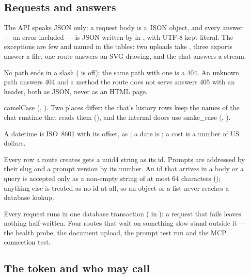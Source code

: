 \subsection{Requests and answers}\label{sec:api:json}

The API speaks JSON only: a request body is a JSON object, and every answer --- an error
included --- is JSON written by  in , with UTF-8 kept
literal. The exceptions are few and named in the tables: two uploads take
, three exports answer a file, one route answers an SVG drawing, and
the chat answers a stream.

\begin{description}[style=unboxed, leftmargin=0pt]
  \item[Paths.] No path ends in a slash ( is off); the same path with one is
    a 404. An unknown path answers 404  and a method the route does not serve
    answers 405  with an  header, both as JSON, never as an
    HTML page.
  \item[Field names.] camelCase (, ). Two places differ: the
    chat's history rows keep the names of the chat runtime that reads them (),
    and the internal doors use snake\_case (, ).
  \item[Values.] A datetime is ISO~8601 with its offset, as ;
    a date is ; a cost is a number of US dollars.
  \item[Ids.] Every row a route creates gets a uuid4 string as its id. Prompts are addressed
    by their slug and a prompt version by its number. An id that arrives in a body or a query
    is accepted only as a non-empty string of at most 64 characters (); anything
    else is treated as no id at all, so an object or a list never reaches a database lookup.
  \item[Transactions.] Every request runs in one database transaction (
    in ): a request that fails leaves nothing half-written. Four routes that
    wait on something slow stand outside it --- the health probe, the document upload, the
    prompt test run and the MCP connection test.
\end{description}

\subsection{The token and who may call}\label{sec:api:auth}

